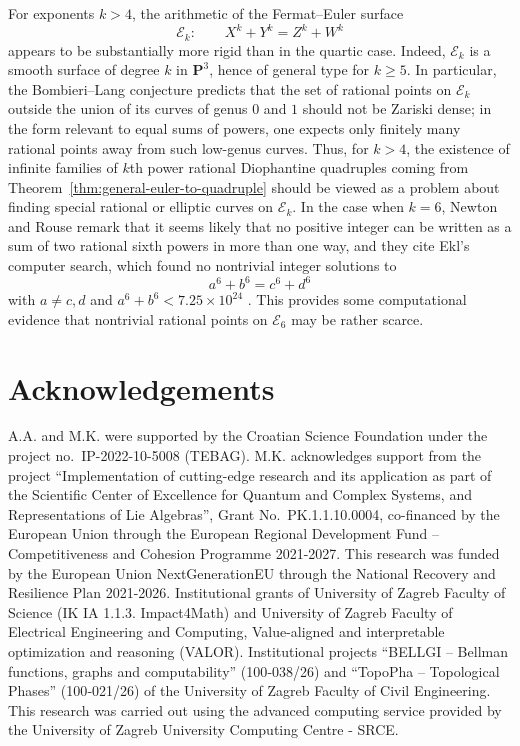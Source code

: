 \documentclass[11pt]{article}
\newcommand{\Pj}{\mathbf{P}}
\begin{document}
For exponents $k>4$, the arithmetic of the Fermat--Euler surface
\[
\mathcal E_k:\qquad X^k+Y^k=Z^k+W^k
\]
appears to be substantially more rigid than in the quartic case. Indeed, $\mathcal E_k$ is a smooth surface of degree $k$ in $\Pj^3$, hence of general type for $k\geq 5$. In particular, the Bombieri--Lang conjecture predicts that the set of rational points on $\mathcal E_k$ outside the union of its curves of genus $0$ and $1$ should not be Zariski dense; in the form relevant to equal sums of powers, one expects only finitely many rational points away from such low-genus curves. Thus, for $k>4$, the existence of infinite families of $k$th power rational Diophantine quadruples coming from Theorem~\ref{thm:general-euler-to-quadruple} should be viewed as a problem about finding special rational or elliptic curves on $\mathcal E_k$. In the case when $k=6$, Newton and Rouse remark that it seems likely that no positive integer can be written as a sum of two rational sixth powers in more than one way, and they cite Ekl's computer search, which found no nontrivial integer solutions to
\[
a^6+b^6=c^6+d^6
\]
with $a\neq c,d$ and $a^6+b^6<7.25\times 10^{24}$ \cite{Ekl,NewtonRouse}. This provides some computational evidence that nontrivial rational points on $\mathcal E_6$ may be rather scarce.


\section{Acknowledgements}

A.A. and M.K. were supported by the Croatian Science Foundation under the project no.\ IP-2022-10-5008 (TEBAG). M.K. acknowledges support from the project “Implementation of cutting-edge research and its application as part of the Scientific Center of Excellence for Quantum and Complex Systems, and Representations of Lie Algebras”, Grant No.\ PK.1.1.10.0004, co-financed by the European Union through the European Regional Development Fund -- Competitiveness and Cohesion Programme 2021-2027. This research was funded by the European Union NextGenerationEU through the National Recovery and Resilience Plan 2021-2026. Institutional grants of University of Zagreb Faculty of Science (IK IA 1.1.3. Impact4Math) and University of Zagreb Faculty of Electrical Engineering and Computing, Value-aligned and interpretable optimization and reasoning (VALOR). Institutional projects “BELLGI – Bellman functions, graphs and computability” (100‑038/26) and “TopoPha – Topological Phases” (100‑021/26) of the University of Zagreb Faculty of Civil Engineering.
This research was carried out using the advanced computing service provided by the University of Zagreb University Computing Centre - SRCE.
\end{document}
